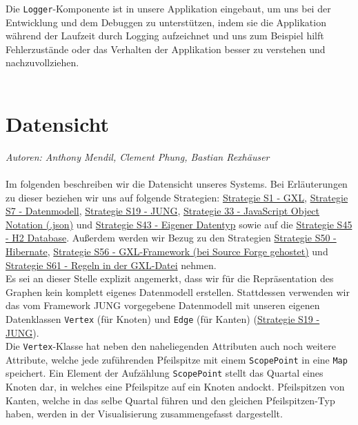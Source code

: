 \documentclass[enabledeprecatedfontcommands,fontsize=11pt,paper=a4,twoside]{scrartcl}
\newcounter{one}
\begin{document}
Die \texttt{Logger}-Komponente ist in unsere Applikation eingebaut, um uns bei der Entwicklung und dem Debuggen zu unterstützen, indem sie die Applikation während der Laufzeit durch Logging aufzeichnet und uns zum Beispiel hilft Fehlerzustände oder das Verhalten der Applikation besser zu verstehen und nachzuvollziehen.\\ \\
\newpage



\newpage
\section{Datensicht}
\label{sec:datensicht}

\emph{Autoren: Anthony Mendil, Clement Phung, Bastian Rexhäuser}\\ \\

Im folgenden beschreiben wir die Datensicht unseres Systems. Bei Erläuterungen zu dieser beziehen wir uns auf folgende Strategien: \hyperlink{yy}{Strategie S1 - GXL}, \hyperlink{aaa}{Strategie S7 - Datenmodell}, \hyperlink{eee}{Strategie S19 - JUNG}, \hyperlink{jjj}{Strategie 33 - JavaScript Object Notation (.json)} und \hyperlink{ooo}{Strategie S43 - Eigener Datentyp} sowie auf die \hyperlink{ppp}{Strategie S45 - H2 Database}. Außerdem werden wir Bezug zu den Strategien \hyperlink{rrr}{Strategie S50 - Hibernate}, \hyperlink{ttt}{Strategie S56 - GXL-Framework (bei Source Forge gehostet)} und \hyperlink{vvv}{Strategie S61 - Regeln in der GXL-Datei} nehmen.\\

Es sei an dieser Stelle explizit angemerkt, dass wir für die Repräsentation des Graphen kein komplett eigenes Datenmodell erstellen. Stattdessen verwenden wir das vom Framework JUNG vorgegebene Datenmodell mit unseren eigenen Datenklassen \texttt{Vertex} (für Knoten) und \texttt{Edge} (für Kanten) (\hyperlink{eee}{Strategie S19 - JUNG}). \\
Die \texttt{Vertex}-Klasse hat neben den naheliegenden Attributen auch noch weitere Attribute, welche jede zuführenden Pfeilspitze mit einem \texttt{ScopePoint} in eine \texttt{Map} speichert. Ein Element der Aufzählung \texttt{ScopePoint} stellt das Quartal eines Knoten dar, in welches eine Pfeilspitze auf ein Knoten andockt. Pfeilspitzen von Kanten, welche in das selbe Quartal führen und den gleichen Pfeilspitzen-Typ haben, werden in der Visualisierung zusammengefasst dargestellt. \\
\end{document}
